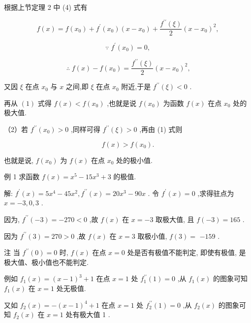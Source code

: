 \documentclass[10pt]{article}
\begin{document}
根据上节定理 2 中 (4) 式有

\[
f\left( x\right) = f\left( {x}_{0}\right) + {f}^{\prime }\left( {x}_{0}\right) \left( {x - {x}_{0}}\right) + \frac{{f}^{\prime \prime }\left( \xi \right) }{2}{\left( x - {x}_{0}\right) }^{2},
\]

\[
\because \;{f}^{\prime }\left( {x}_{0}\right) = 0,
\]

\[
\therefore \;f\left( x\right) - f\left( {x}_{0}\right) = \frac{{f}^{\prime \prime }\left( \xi \right) }{2}{\left( x - {x}_{0}\right) }^{2}\text{,} \tag{1}
\]

又因 \(\xi\) 在点 \({x}_{0}\) 与 \(x\) 之间,即 \(\xi\) 在点 \({x}_{0}\) 附近,于是 \({f}^{\prime \prime }\left( \xi \right) < 0\) .

再从 \(\left( 1\right)\) 式得 \(f\left( x\right) < f\left( {x}_{0}\right)\) ,也就是说 \(f\left( {x}_{0}\right)\) 为函数 \(f\left( x\right)\) 在点 \({x}_{0}\) 处的极大值.

（2）若 \({f}^{\prime \prime }\left( {x}_{0}\right) > 0\) ,同样可得 \({f}^{\prime \prime }\left( \xi \right) > 0\) ,再由 (1) 式则

\[
f\left( x\right) > f\left( {x}_{0}\right) \text{.}
\]

也就是说, \(f\left( {x}_{0}\right)\) 为 \(f\left( x\right)\) 在点 \({x}_{0}\) 处的极小值.

例 1 求函数 \(f\left( x\right) = {x}^{5} - {15}{x}^{3} + 3\) 的极值.

解: \({f}^{\prime }\left( x\right) = 5{x}^{4} - {45}{x}^{2},{f}^{\prime \prime }\left( x\right) = {20}{x}^{3} - {90x}\) . 令 \({f}^{\prime }\left( x\right) = 0\) ,求得驻点为 \(x = - 3,0,3\) .

因为, \({f}^{\prime \prime }\left( {-3}\right) = - {270} < 0\) ,故 \(f\left( x\right)\) 在 \(x = - 3\) 取极大值, 且 \(f\left( {-3}\right) = {165}\) .

因为 \({f}^{\prime \prime }\left( 3\right) = {270} > 0\) ,故 \(f\left( x\right)\) 在 \(x = 3\) 取极小值, \(f\left( 3\right) =\) \(- {159}\) .

注 当 \({f}^{\prime \prime }\left( 0\right) = 0\) 时, \(f\left( x\right)\) 在点 \(x = 0\) 处是否有极值不能判定, 即使有极值, 是极大值、极小值也不能判定.

例如 \({f}_{1}\left( x\right) = {\left( x - 1\right) }^{3} + 1\) 在点 \(x = 1\) 处 \({f}_{1}^{\prime \prime }\left( 1\right) = 0\) ,从 \({f}_{1}\left( x\right)\) 的图象可知 \({f}_{1}\left( x\right)\) 在 \(x = 1\) 处无极值.

又如 \({f}_{2}\left( x\right) = - {\left( x - 1\right) }^{4} + 1\) 在点 \(x = 1\) 处 \({f}_{2}^{\prime \prime }\left( 1\right) = 0\) ,从 \({f}_{2}\left( x\right)\) 的图象可知 \({f}_{2}\left( x\right)\) 在 \(x = 1\) 处有极大值 1 .
\end{document}
